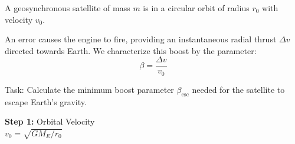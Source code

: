 \begin{minipage}[t!]{\linewidth} 
    \centering
    \begin{tcolorbox}[
        title={\textbf{IPhO 2005 Q1}},
        colback=white,
        colframe=gray!50!black,
        arc=3pt,
        boxrule=1pt,
        fonttitle=\sffamily\large,
        width=\linewidth
    ]
    
        \begin{tcolorbox}[
            colback=gray!5,
            colframe=gray!20,
            coltitle=black,
            title={\small \textbf{QUESTION}},
            fontupper=\small\sffamily,
            boxrule=0.5pt,
            sharp corners,
            left=3pt, right=3pt, top=3pt, bottom=3pt
        ]
            A geosynchronous satellite of mass $m$ is in a circular orbit of radius $r_0$ with velocity $v_0$.
            \vspace{0.5em}
            
            An error causes the engine to fire, providing an instantaneous radial thrust $\Delta v$ directed towards Earth. We characterize this boost by the parameter:
            \[ \beta = \frac{\Delta v}{v_0} \]
            
            Task: Calculate the minimum boost parameter $\beta_{\text{esc}}$ needed for the satellite to escape Earth's gravity.
        \end{tcolorbox}
    
        \vspace{0.5em}
    
        \noindent
        \begin{minipage}[t]{0.49\linewidth}
            \vspace{0pt}
            \begin{tcolorbox}[
                title={\small \textbf{BASE MODEL}},
                colframe=blue!60!white,
                colback=blue!5!white,
                coltitle=white,
                fontupper=\small\ttfamily\raggedright,
                boxrule=0.5pt,
                sharp corners,
                left=2pt, right=2pt,
                width=\linewidth,
                nobeforeafter
            ]
                \textbf{\textcolor{blue!60!black}{Step 1:}} Orbital Velocity\\
                $v_0 = \sqrt{GM_E / r_0}$
                \vspace{1em}
                

\end{tcolorbox}
\end{minipage}
\end{tcolorbox}
\end{minipage}
